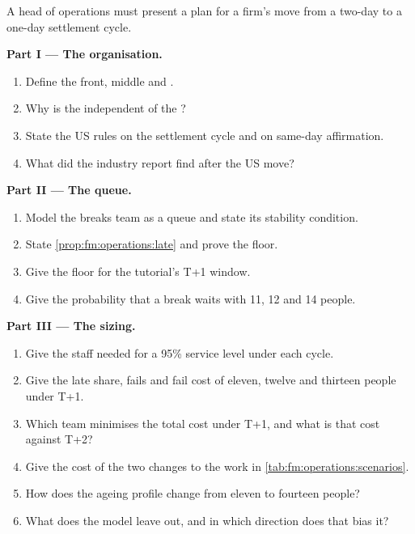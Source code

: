 \begin{problem}\label{pb:fm:operations:1}
A head of operations must present a plan for a firm's move from a two-day to a one-day settlement cycle.

\medskip\noindent\textbf{Part I --- The organisation.}
\begin{enumerate}
\item Define the front, middle and .
\item Why is the  independent of the ?
\item State the US rules on the settlement cycle and on same-day affirmation.
\item What did the industry report find after the US move?
\end{enumerate}

\medskip\noindent\textbf{Part II --- The queue.}
\begin{enumerate}[resume]
\item Model the breaks team as a queue and state its stability condition.
\item State \cref{prop:fm:operations:late} and prove the floor.
\item Give the floor for the tutorial's T+1 window.
\item Give the probability that a break waits with 11, 12 and 14 people.
\end{enumerate}

\medskip\noindent\textbf{Part III --- The sizing.}
\begin{enumerate}[resume]
\item Give the staff needed for a 95\% service level under each cycle.
\item Give the late share, fails and fail cost of eleven, twelve and thirteen people under T+1.
\item Which team minimises the total cost under T+1, and what is that cost against T+2?
\item Give the cost of the two changes to the work in \cref{tab:fm:operations:scenarios}.
\item How does the ageing profile change from eleven to fourteen people?
\item What does the model leave out, and in which direction does that bias it?
\end{enumerate}


\end{problem}
